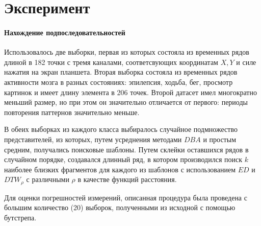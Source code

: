 \documentclass[12pt,twoside]{article}
\begin{document}
						
    \section{Эксперимент}

        \paragraph{Нахождение подпоследовательностей}
        Использовалось две выборки, первая из которых состояла из временных рядов длиной в 182 точки с тремя каналами, соответсвующих координатам $X, Y$ 
            и силе нажатия на экран планшета.
        Вторая выборка состояла из временных рядов активности мозга в разных состояниях: эпилепсия, ходьба, бег, просмотр картинок и имеет длину элемента в 206 точек.
        Второй датасет имел многократно меньший размер, но при этом он значительно отличается от первого: периоды повторения паттернов значительно меньше.

        В обеих выборках из каждого класса выбиралось случайное подмножество представителей, из которых,
            путем усреднения методами $DBA$ и простым средним, получались поисковые шаблоны. 
        Путем склейки оставшихся рядов в случайном порядке, создавался длинный ряд, в котором производился поиск $k$ наиболее близких фрагментов 
            для каждого из шаблонов с использованием $ED$ и $DTW_\rho$ с различными $\rho$ в качестве функций расстояния.
            
        Для оценки погрешностей измерений, описанная процедура была проведена с большим количество (20) выборок, полученными из исходной с помощью бутстрепа.    
    
\end{document}
